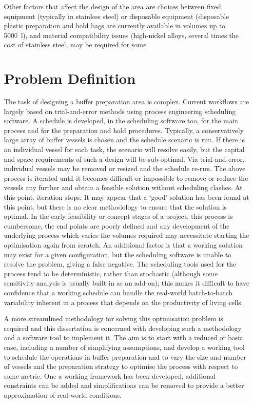 Other factors that affect the design of the area are choices between fixed
equipment (typically in stainless steel) or disposable equipment (disposable
plastic preparation and hold bags are currently available in volumes up to
\SI{5000}{\litre}), and material compatibility issues (high-nickel alloys,
several times the cost of stainless steel, may be required for some

\section{Problem Definition}\label{SS.probdef}
The task of designing a buffer preparation area is complex.
Current workflows are largely based on trial-and-error methods using process
engineering scheduling software.
A schedule is developed, in the scheduling software too, for the main process
and for the preparation and hold procedures.
Typically, a conservatively large array of buffer vessels is chosen and the
schedule scenario is run.
If there is an individual vessel for each task, the scenario will resolve
easily, but the capital and space requirements of such a design will be
sub-optimal.
Via trial-and-error, individual vessels may be removed or resized and
the schedule re-run.
The above process is iterated until it becomes difficult or impossible to
remove or reduce the vessels any further and obtain a feasible solution without
scheduling clashes.
At this point, iteration stops.
It may appear that a `good' solution has been found at this point, but there
is no clear methodology to ensure that the solution is optimal.
In the early feasibility or concept stages of a project, this process is
cumbersome, the end points are poorly defined and any development of the
underlying process which varies the volumes required may necessitate starting
the optimisation again from scratch.
An additional factor is that a working solution may exist for a given
configuration, but the scheduling software is unable to resolve the problem,
giving a false negative. 
The scheduling tools used for the process tend to be deterministic, rather than
stochastic (although some sensitivity analysis is usually built in as an 
add-on); this makes it difficult to have confidence that a working schedule can
handle the real-world batch-to-batch variability inherent in a process that
depends on the productivity of living cells.

A more streamlined methodology for solving this optimisation problem is
required and this dissertation is concerned with developing such a methodology
and a software tool to implement it.
The aim is to start with a reduced or basic case, including a number of
simplifying assumptions, and develop a working tool to schedule the operations
in buffer preparation and to vary the size and number of vessels and the 
preparation strategy to optimise the process with respect to some metric.
One a working framework has been developed, additional constraints can be added
and simplifications can be removed to provide a better approximation of 
real-world conditions.

